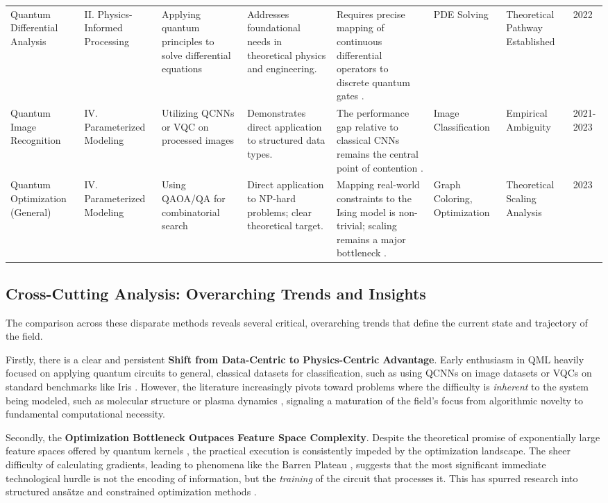 \documentclass{article}
\begin{document}
\begin{table}[ht]
{\begin{tabular}{llllllll}
Quantum Differential Analysis & II. Physics-Informed Processing & Applying quantum principles to solve differential equations & Addresses foundational needs in theoretical physics and engineering. & Requires precise mapping of continuous differential operators to discrete quantum gates \cite{kiani2022quantum}. & PDE Solving & Theoretical Pathway Established & 2022 \\
Quantum Image Recognition & IV. Parameterized Modeling & Utilizing QCNNs or VQC on processed images & Demonstrates direct application to structured data types. & The performance gap relative to classical CNNs remains the central point of contention . & Image Classification & Empirical Ambiguity & 2021-2023 \\
Quantum Optimization (General) & IV. Parameterized Modeling & Using QAOA/QA for combinatorial search & Direct application to NP-hard problems; clear theoretical target. & Mapping real-world constraints to the Ising model is non-trivial; scaling remains a major bottleneck \cite{sankar2024benchmarking}. & Graph Coloring, Optimization & Theoretical Scaling Analysis & 2023 \\
\bottomrule
\end{tabular}
}
\end{table}

\subsection{Cross-Cutting Analysis: Overarching Trends and Insights}

\label{sec:cross\_cutting\_analysis\_overarching\_trend}

The comparison across these disparate methods reveals several critical, overarching trends that define the current state and trajectory of the field.

Firstly, there is a clear and persistent \textbf{Shift from Data-Centric to Physics-Centric Advantage}. Early enthusiasm in QML heavily focused on applying quantum circuits to general, classical datasets for classification, such as using QCNNs on image datasets \cite{goto2021universal} or VQCs on standard benchmarks like Iris \cite{piatrenka2022quantum}. However, the literature increasingly pivots toward problems where the difficulty is \textit{inherent} to the system being modeled, such as molecular structure or plasma dynamics , signaling a maturation of the field's focus from algorithmic novelty to fundamental computational necessity.

Secondly, the \textbf{Optimization Bottleneck Outpaces Feature Space Complexity}. Despite the theoretical promise of exponentially large feature spaces offered by quantum kernels \cite{jager2023universal}, the practical execution is consistently impeded by the optimization landscape. The sheer difficulty of calculating gradients, leading to phenomena like the Barren Plateau \cite{cerezo2021cost}, suggests that the most significant immediate technological hurdle is not the encoding of information, but the \textit{training} of the circuit that processes it. This has spurred research into structured ansätze \cite{goto2021universal} and constrained optimization methods \cite{wang2024trainability}.
\end{document}
